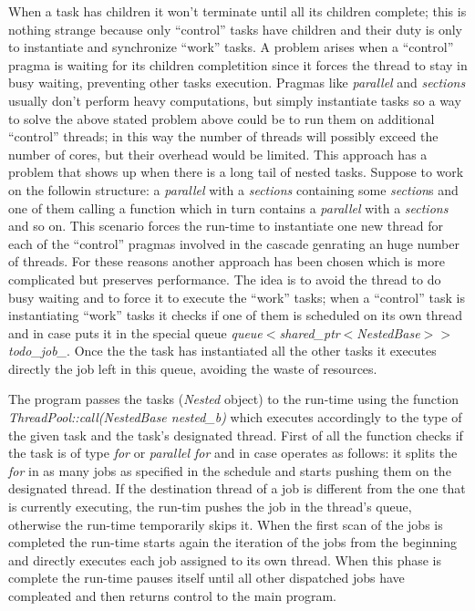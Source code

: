\documentclass[a4paper,11pt,oneside]{book}
\begin{document}
When a task has children it won’t terminate until all its children complete; this is nothing strange because only “control” tasks have children and their duty is only to instantiate and synchronize “work” tasks. A problem arises when a “control” pragma is waiting for its children completition since it forces the thread to  stay in busy waiting, preventing other tasks execution. Pragmas like \emph{parallel} and \emph{sections} usually don’t perform heavy computations, but simply instantiate tasks so a way to solve the above stated problem above could be to run them on additional “control” threads; in this way the number of threads will possibly exceed the number of cores, but their overhead would be limited. This approach has a problem that shows up when there is a long tail of nested tasks. Suppose to work on the followin structure: a \emph{parallel} with a \emph{sections} containing some \emph{section}s and one of them calling a function which in turn contains a \emph{parallel} with a \emph{sections} and so on. This scenario forces the run-time to instantiate one new thread for each of the “control” pragmas involved in the cascade genrating an huge number of threads. For these reasons another approach has been chosen which is more complicated but preserves performance. The idea is to avoid the thread to do busy waiting and to force it to execute the “work” tasks; when a “control” task is instantiating “work” tasks it checks if one of them is scheduled on its own thread and in case puts it in the special queue \emph{queue$<$shared\_ptr$<$NestedBase$>>$ todo\_job\_}. Once the the task has instantiated all the other tasks it executes directly the job left in this queue, avoiding the waste of resources.

The program passes the tasks (\emph{Nested} object) to the run-time using the function \emph{ThreadPool::call(NestedBase nested\_b)} which executes accordingly to the type of the given task and the task's designated thread. First of all the function checks if the task is of type \emph{for} or \emph{parallel for} and in case operates as follows: it splits the \emph{for} in as many jobs as specified in the schedule and starts pushing them on the designated thread. If the destination thread of a job is different from the  one that is currently executing, the run-tim pushes the job in the thread’s queue, otherwise the run-time temporarily skips it. When the first scan of the jobs is completed the run-time starts again the iteration of the jobs from the beginning and directly executes each job assigned to its own thread. When this phase is complete the run-time pauses itself until all other dispatched jobs have compleated and then returns control to the main program. 
\end{document}
